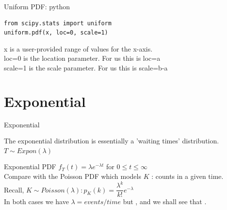 \documentclass[10pt,sans,english,compress,xcolor=dvipsnames]{beamer}
\begin{document}
\begin{frame}[fragile]{Uniform PDF: python}

\begin{verbatim}
from scipy.stats import uniform
uniform.pdf(x, loc=0, scale=1)
\end{verbatim}
\vspace{0.5cm}

x is a user-provided range of values for the x-axis.\\[2ex]
loc=0 is the location parameter. For us this is loc=a\\[2ex]
scale=1 is the scale parameter. For us this is scale=b-a\\[2ex]

\end{frame} 



\section{Exponential}

\begin{frame}{Exponential}

The exponential distribution is essentially a 'waiting times' distribution.\\[1ex]

$T\sim Expon(\lambda)$\\[2ex]


\end{frame} 

\begin{frame}{Exponential PDF}
$f_T(t) = \lambda e^{-\lambda t} $ for $0\leq t \leq \infty$\\[1ex]

Compare with the Poisson PDF which models $K$ : counts in a given time.\\[1ex]

Recall, $K \sim Poisson(\lambda): p_K(k) = \dfrac{\lambda^{k}}{k!} e^{-\lambda}$\\[1ex]

In both cases we have $\lambda = events/time$ but , and we shall see that .\\[1ex]

\end{frame} 
\end{document}
